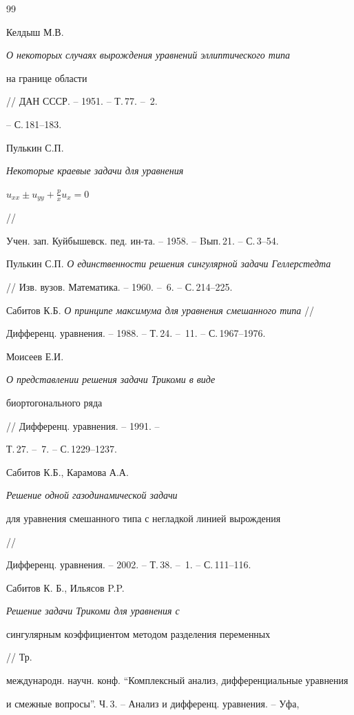 \begin{thebibliography}{99}







Келдыш М.В. {\em О некоторых случаях вырождения уравнений эллиптического типа 


на границе области} // ДАН СССР. -- 1951. -- Т.\,77. -- \No\,2.


-- С.\,181--183.




Пулькин С.П. {\em Некоторые краевые задачи для уравнения


$u_{xx}\pm u_{yy}+\frac{p}{x}u_x=0$} //


Учен. зап. Куйбышевск. пед. ин-та. -- 1958. -- Bып.\,21. -- С.\,3--54. 




Пулькин С.П. {\em О единственности решения сингулярной задачи Геллерстедта}


// Изв. вузов. Математика. -- 1960. -- \No\,6. -- С.\,214--225.




Сабитов К.Б. {\em О принципе максимума для уравнения смешанного типа} //


Дифференц. уравнения. -- 1988. -- Т.\,24. -- \No\,11. -- С.\,1967--1976.




Моисеев Е.И. {\em О представлении решения задачи Трикоми в виде 


биортогонального ряда} // Дифференц. уравнения. -- 1991. --


Т.\,27. -- \No\,7. -- С.\,1229--1237.




Сабитов К.Б., Карамова А.А. {\em Решение одной газодинамической задачи 


для уравнения смешанного типа с негладкой линией вырождения} //


Дифференц. уравнения. -- 2002. -- Т.\,38. -- \No\,1. -- С.\,111--116.




Сабитов К. Б., Ильясов P.P. {\em Решение задачи Трикоми для уравнения с 


сингулярным коэффициентом методом разделения переменных} // Тр.


международн. научн. конф. ``Комплексный анализ, дифференциальные уравнения


и смежные вопросы''. Ч.\,3. -- Анализ и дифференц. уравнения. -- Уфа,



\end{thebibliography}
